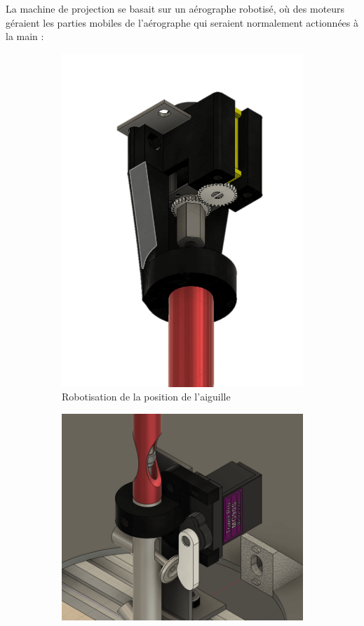 \newpage
La machine de projection se basait sur un aérographe robotisé, où des moteurs géraient les parties mobiles
de l'aérographe qui seraient normalement actionnées à la main :
\begin{figure}[H]
    \centering
    \begin{subfigure}{.35\textwidth}
        \centering
        \includegraphics[width=1\linewidth]{assets/figures/situation_initiale/robotisation_aiguille.png}
        \caption{Robotisation de la position de l'aiguille}
        \label{fig:robot_aiguille}
    \end{subfigure}%
    \begin{subfigure}{.65\textwidth}
        \centering
        \includegraphics[width=.75\linewidth]{assets/figures/situation_initiale/Robotisation_projection.png}

\end{subfigure}
\end{figure}
